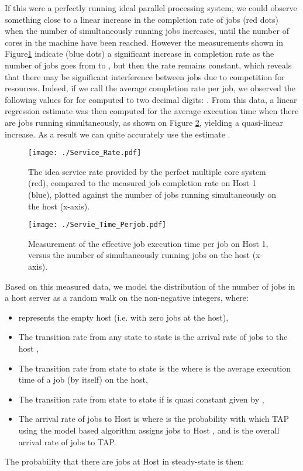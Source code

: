 \documentclass[journal]{IEEEtran}
\begin{document}
If this were a perfectly running ideal parallel processing system, we could observe something close to a linear increase in the completion rate of jobs (red dots) when the number of simultaneously running jobs increases, until the
number of cores in the machine  have been reached. However the measurements shown in Figure\ref{fig:service_rate} indicate (blue dots)
a significant increase in completion rate as the number of jobs goes from  to , but then the rate remains constant, which reveals that there may be significant interference between jobs due to competition for resources. Indeed, if we call  the average completion rate per job, we observed the following values for  for  computed to two decimal digits:
. From this data, a linear regression estimate was then computed for the average execution time  when there
are  jobs running simultaneously, as shown on Figure \ref{fig:service_time_perjob}, yielding a quasi-linear increase. As a result we can quite accurately
use the estimate . 
\begin{figure}[ht]
     \centering
      \texttt{[image: ./Service\_Rate.pdf]} \caption{The idea service rate provided by the perfect multiple core system (red), compared to the measured job completion rate on Host 1 (blue),
  plotted against the number of jobs running simultaneously on the host (x-axis).}
     \label{fig:service_rate}
    \end{figure}
     \begin{figure}[ht]
     \centering
      \texttt{[image: ./Servie\_Time\_Perjob.pdf]} \caption{Measurement of the effective job execution time per job on Host 1, versus the number of simultaneously running jobs 
     on the host (x-axis).}
     \label{fig:service_time_perjob}
    \end{figure}
Based on this measured data, we model the distribution of the number of jobs in a host server  as a random walk on the non-negative integers,
where:
\begin{itemize}
\item  represents the empty host (i.e. with zero jobs at the host), 
\item The transition rate from any state  to state  is the arrival rate of jobs to the host
, 
\item The transition rate from state  to state  is the  where  is the average execution time of a job (by itself) on the host,
\item The transition rate from state  to state  if  is quasi constant given by ,
\item The arrival rate of jobs to Host  is  where  is the probability with which TAP using the model based algorithm assigns 
jobs to Host , and  is the overall arrival rate of jobs to TAP.
\end{itemize}
The probability that there are  jobs at Host  in steady-state is then:
\end{document}
